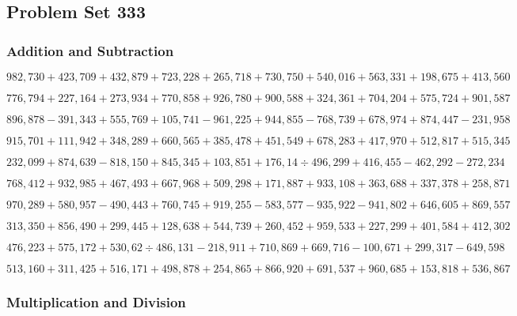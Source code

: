 \hypertarget{problem-set-333}{%
\subsection{Problem Set 333}\label{problem-set-333}}

\hypertarget{addition-and-subtraction}{%
\subsubsection{Addition and
Subtraction}\label{addition-and-subtraction}}

\(982,730+423,709+432,879+723,228+265,718+730,750+540,016+563,331+198,675+413,560\)

\(776,794+227,164+273,934+770,858+926,780+900,588+324,361+704,204+575,724+901,587\)

\(896,878-391,343+555,769+105,741-961,225+944,855-768,739+678,974+874,447-231,958\)

\(915,701+111,942+348,289+660,565+385,478+451,549+678,283+417,970+512,817+515,345\)

\(232,099+874,639-818,150+845,345+103,851+176,14÷496,299+416,455-462,292-272,234\)

\(768,412+932,985+467,493+667,968+509,298+171,887+933,108+363,688+337,378+258,871\)

\(970,289+580,957-490,443+760,745+919,255-583,577-935,922-941,802+646,605+869,557\)

\(313,350+856,490+299,445+128,638+544,739+260,452+959,533+227,299+401,584+412,302\)

\(476,223+575,172+530,62÷486,131-218,911+710,869+669,716-100,671+299,317-649,598\)

\(513,160+311,425+516,171+498,878+254,865+866,920+691,537+960,685+153,818+536,867\)

\hypertarget{multiplication-and-division}{%
\subsubsection{Multiplication and
Division}\label{multiplication-and-division}}


